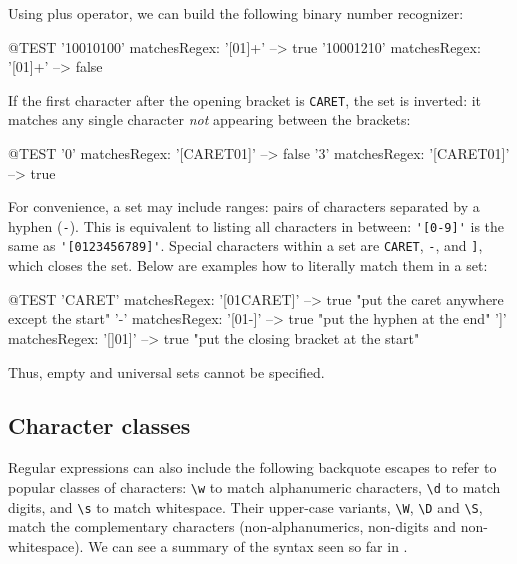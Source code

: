 \documentclass[10pt,twoside,chapterprefix=false]{scrbook}
\renewcommand{\ct}{\lstinline[mathescape=false,basicstyle={\sffamily\upshape}]}
\begin{document}
{Using plus operator, we can build the following binary number recognizer:
\begin{ToSh-code}{@TEST}
'10010100' matchesRegex: '[01]+' --> true
'10001210' matchesRegex: '[01]+' --> false
\end{ToSh-code}

If the first character after the opening bracket is \ct{CARET}, the set is inverted: it matches any single character \emph{not} appearing between the brackets:
\begin{ToSh-code}{@TEST}
'0' matchesRegex: '[CARET01]' --> false
'3' matchesRegex: '[CARET01]' --> true
\end{ToSh-code}

For convenience, a set may include ranges: pairs of characters separated by a hyphen (\ct{-}). This is equivalent to listing all characters in between: \ct{'[0-9]'} is the same as \ct{'[0123456789]'}.
Special characters within a set are \ct{CARET}, \ct{-}, and \ct{]}, which closes the set. Below are examples how to literally match them in a set:
\begin{ToSh-code}{@TEST}
'CARET' matchesRegex: '[01CARET]'   --> true    "put the caret anywhere except the start"
'-' matchesRegex: '[01-]' --> true    "put the hyphen at the end"
']' matchesRegex: '[]01]'   --> true    "put the closing bracket at the start"
\end{ToSh-code}

Thus, empty and universal sets cannot be specified.

\subsection{Character classes}
Regular expressions can also include the following backquote escapes to refer to popular classes of characters: \ct{\w} to match alphanumeric characters, \ct{\d} to match digits, and \ct{\s} to match whitespace.
Their upper-case variants, \ct{\W}, \ct{\D} and \ct{\S}, match the complementary characters (non-alphanumerics, non-digits and non-whitespace).
We can see a summary of the syntax seen so far in .

}
\end{document}
